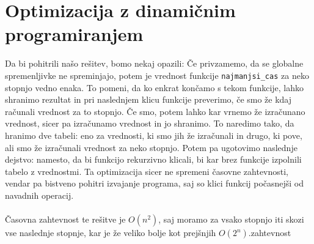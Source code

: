 \section{Optimizacija z dinamičnim programiranjem}\label{sec:optimizacija-z-dinamicnim-programiranjem}
Da bi pohitrili našo rešitev, bomo nekaj opazili:
Če privzamemo, da se globalne spremenljivke ne spreminjajo, potem je vrednost funkcije \texttt{najmanjsi\_cas} za neko stopnjo vedno enaka.
To pomeni, da ko enkrat končamo s tekom funkcije, lahko shranimo rezultat in pri naslednjem klicu funkcije preverimo, če smo že kdaj računali vrednost za to stopnjo.
Če smo, potem lahko kar vrnemo že izračunano vrednost, sicer pa izračunamo vrednost in jo shranimo.
To naredimo tako, da hranimo dve tabeli: eno za vrednosti, ki smo jih že izračunali in drugo, ki pove, ali smo že izračunali vrednost za neko stopnjo.
Potem pa ugotovimo naslednje dejstvo:
namesto, da bi funkcijo rekurzivno klicali, bi kar brez funkcije izpolnili tabelo z vrednostmi.
Ta optimizacija sicer ne spremeni časovne zahtevnosti, vendar pa bistveno pohitri izvajanje programa, saj so klici funkcij počasnejši od navadnih operacij.
\\
\\
Časovna zahtevnost te rešitve je $O(n^2)$, saj moramo za vsako stopnjo iti skozi vse naslednje stopnje, kar je že veliko bolje kot prejšnjih $O(2^n)$.zahtevnost